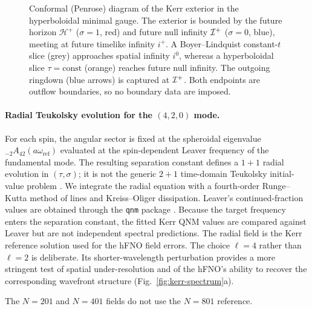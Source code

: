 \begin{figure}[!htbp]
\caption{Conformal (Penrose) diagram of the Kerr exterior in the
hyperboloidal minimal gauge. The exterior is bounded by the
future horizon $\mathcal{H}^{+}$ ($\sigma = 1$, red) and future
null infinity $\mathcal{I}^{+}$ ($\sigma = 0$, blue), meeting at future
timelike infinity $i^{+}$. A Boyer--Lindquist constant-$t$ slice
(grey) approaches spatial infinity $i^{0}$, whereas a hyperboloidal
slice $\tau = \mathrm{const}$ (orange) reaches future null infinity.
The outgoing ringdown (blue arrows) is captured at $\mathcal{I}^{+}$. Both
endpoints are outflow boundaries, so no boundary data are imposed.}
\label{fig:kerr-slicing}
\end{figure}

\paragraph{Radial Teukolsky evolution for the $(4,2,0)$ mode.} For
each spin, the angular sector is fixed at the spheroidal eigenvalue
${}_{-2}A_{42}(a\omega_{\mathrm{ref}})$ evaluated at the
spin-dependent Leaver frequency of the fundamental mode. The resulting
separation constant defines a $1+1$ radial evolution in
$(\tau,\sigma)$; it is not the generic $2+1$ time-domain Teukolsky
initial-value problem \citep{Harms2013,PanossoMacedo2020}. We
integrate the radial equation with a fourth-order Runge--Kutta method
of lines and Kreiss--Oliger dissipation. Leaver's continued-fraction
values are obtained through the \texttt{qnm} package
\citep{Leaver1985,Stein2019qnm}. Because the target frequency enters
the separation constant, the fitted Kerr QNM values are compared
against Leaver but are not independent spectral predictions. The
radial field is the Kerr reference solution used for the hFNO field
errors.
The choice $\ell=4$ rather than $\ell=2$ is deliberate. Its
shorter-wavelength perturbation provides a more stringent test of
spatial under-resolution and of the hFNO's ability to recover the
corresponding wavefront structure (Fig.~\ref{fig:kerr-spectrum}a).

The $N=201$ and $N=401$ fields do not use the $N=801$ reference.

